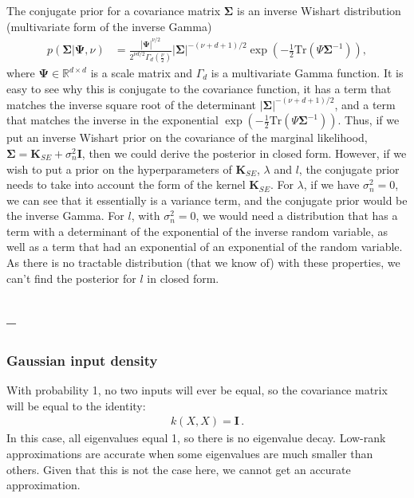 \documentclass[a4paper]{article}
\newcommand{\mat}[1]{{\boldsymbol{{#1}}}} %
\newcommand{\questionref}[1]{\Cref{#1} -- \nameref{#1}}
\theoremstyle{definition}
\begin{document}
The conjugate prior for a covariance matrix $\mathbf{\Sigma}$ is an inverse Wishart distribution (multivariate form of the inverse Gamma)
\begin{align}
p(\mathbf{\Sigma}| \mathbf{\Psi}, \nu) &= \frac{|\mathbf{\Psi}|^{\nu/2}}{2^{\nu d / 2} \Gamma_d (\frac{\nu}{2})} |\mathbf{\Sigma}|^{-(\nu + d +1) / 2} \exp \left( - \frac{1}{2} \text{Tr}(\Psi \mathbf{\Sigma}^{-1}) \right),
\end{align}
where $\mathbf{\Psi}  \in \mathbb{R}^{d \times d}$ is a scale matrix and $\Gamma_d$ is a multivariate Gamma function.
It is easy to see why this is conjugate to the covariance function, it has a term that matches the inverse square root of the determinant $|\mathbf{\Sigma}|^{-(\nu + d +1) / 2}$, and a term that matches the inverse in the exponential $\exp \left( - \frac{1}{2} \text{Tr}(\Psi \mathbf{\Sigma}^{-1}) \right)$.
Thus, if we put an inverse Wishart prior on the covariance of the marginal likelihood, $\mathbf{\Sigma} = \mathbf{K}_{SE} + \sigma_n^2\mathbf{I}$, then we could derive the posterior in closed form.
However, if we wish to put a prior on the hyperparameters of $\mathbf{K}_{SE}$, $\lambda$ and $l$, the conjugate prior needs to take into account the form of the kernel $\mathbf{K}_{SE}$.
For $\lambda$, if we have $\sigma^2_n = 0$, we can see that it essentially is a variance term, and the conjugate prior would be the inverse Gamma. 
For $l$, with $\sigma^2_n = 0$, we would need a distribution that has a term with a determinant of the exponential of the inverse random variable, as well as a term that had an exponential of an exponential of the random variable.
As there is no tractable distribution (that we know of) with these properties, we can't find the posterior for $l$ in closed form.

\subsection{\questionref{q:sparse-approx}}
\subsubsection{Gaussian input density}
With probability 1, no two inputs will ever be equal, so the covariance matrix will be equal to the identity:
\begin{align}
k(X,X) = \mat I \,.
\end{align}
In this case, all eigenvalues equal 1, so there is no eigenvalue decay. Low-rank approximations are accurate when some eigenvalues are much smaller than others. Given that this is not the case here, we cannot get an accurate approximation.
\end{document}
